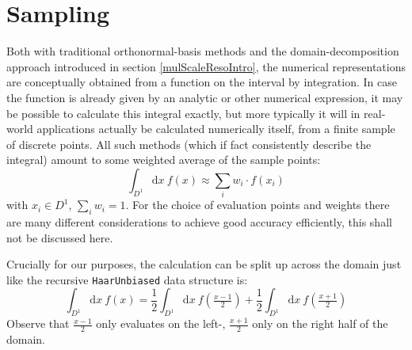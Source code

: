 \documentclass[sigplan,review,anonymous]{acmart}\settopmatter{printfolios=true,printccs=false,printacmref=false}
\theoremstyle{acmplain}
\theoremstyle{acmdefinition}
\begin{document}
\section{Sampling}
Both with traditional orthonormal-basis methods and the domain-decomposition approach introduced in section \ref{mulScaleResoIntro}, the numerical representations are conceptually obtained from a function on the interval by integration. In case the function is already given by an analytic or other numerical expression, it may be possible to calculate this integral exactly, but more typically it will in real-world applications actually be calculated numerically itself, from a finite sample of discrete points. All such methods (which if fact consistently describe the integral) amount to some weighted average of the sample points:
\[
  \int_{D^1}\!\mathrm{d}x\:f(x) \approx \sum_i w_i\cdot f(x_i)
\]
with $x_i\in D^1$, $\sum_i w_i = 1$. For the choice of evaluation points and weights there are many different considerations to achieve good accuracy efficiently, this shall not be discussed here.

Crucially for our purposes, the calculation can be split up across the domain just like the recursive \lstinline`HaarUnbiased` data structure is:
\[
  \int_{D^1}\!\mathrm{d}x\:f(x)
    = \frac12\int_{D^1}\!\mathrm{d}x\:f(\tfrac{x-1}2)
    + \frac12\int_{D^1}\!\mathrm{d}x\:f(\tfrac{x+1}2)
\]
Observe that $\tfrac{x-1}2$ only evaluates on the left-, $\tfrac{x+1}2$ only on the right half of the domain.
\end{document}
